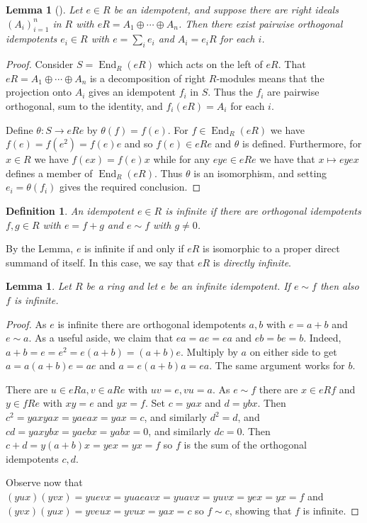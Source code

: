 \documentclass[a4paper,12pt]{article}
\theoremstyle{plain}
\newtheorem{lemma}[proposition]{Lemma}
\newtheorem{definition}[proposition]{Definition}
\theoremstyle{definition}
\newcommand{\mend}{\operatorname{End}}
\begin{document}
\begin{lemma}[{\cite[Lemma~1.1]{agp}}]\label{lem:4}
Let $e\in R$ be an idempotent, and suppose there are right ideals $(A_i)_{i=1}^n$ in $R$ with
$eR = A_1 \oplus \cdots \oplus A_n$.  Then there exist pairwise orthogonal idempotents $e_i\in R$ with
$e=\sum_i e_i$ and $A_i=e_iR$ for each $i$.
\end{lemma}
\begin{proof}
Consider $S = \mend_R(eR)$ which acts on the left of $eR$.  That $eR = A_1 \oplus \cdots \oplus A_n$ is
a decomposition of right $R$-modules means that the projection onto $A_i$ gives an idempotent $f_i$ in $S$.
Thus the $f_i$ are pairwise orthogonal, sum to the identity, and $f_i(eR) = A_i$ for each $i$.

Define $\theta:S\rightarrow eRe$ by $\theta(f) = f(e)$.  For $f\in\mend_R(eR)$ we have $f(e) = f(e^2) = f(e)e$
and so $f(e)\in eRe$ and $\theta$ is defined.  Furthermore, for $x\in R$ we have $f(ex) = f(e)x$ while for any
$eye\in eRe$ we have that $x \mapsto eyex$ defines a member of $\mend_R(eR)$.  Thus $\theta$ is an isomorphism,
and setting $e_i = \theta(f_i)$ gives the required conclusion.
\end{proof}

\begin{definition}
An idempotent $e\in R$ is \emph{infinite} if there are orthogonal idempotents $f,g\in R$ with $e=f+g$ and
$e\sim f$ with $g\not=0$.
\end{definition}

By the Lemma, $e$ is infinite if and only if $eR$ is isomorphic to a proper direct summand of itself.
In this case, we say that $eR$ is \emph{directly infinite}.

\begin{lemma}\label{lem:5}
Let $R$ be a ring and let $e$ be an infinite idempotent.  If $e\sim f$ then also $f$ is infinite.
\end{lemma}
\begin{proof}
As $e$ is infinite there are orthogonal idempotents $a,b$ with $e=a+b$ and $e\sim a$.
As a useful aside, we claim that $ea=ae=ea$ and $eb=be=b$.  Indeed, $a+b = e = e^2 = e(a+b) = (a+b)e$.
Multiply by $a$ on either side to get $a = a(a+b)e = ae$ and $a = e(a+b)a = ea$.  The same argument works for $b$.

There are $u\in eRa, v\in aRe$ with $uv = e, vu = a$.  As $e\sim f$ there are $x\in eRf$ and $y\in fRe$
with $xy = e$ and $yx = f$.  Set $c = yax$ and $d = ybx$.  Then $c^2 = yaxyax = yaeax = yax = c$, and similarly
$d^2=d$, and $cd = yaxybx = yaebx = yabx = 0$, and similarly $dc=0$.  Then $c+d = y(a+b)x = yex = yx = f$ so
$f$ is the sum of the orthogonal idempotents $c,d$.

Observe now that $(yux)(yvx) = yuevx = yuaeavx = yuavx = yuvx = yex = yx = f$ and $(yvx)(yux) = yveux = yvux
= yax = c$ so $f\sim c$, showing that $f$ is infinite.
\end{proof}
\end{document}
